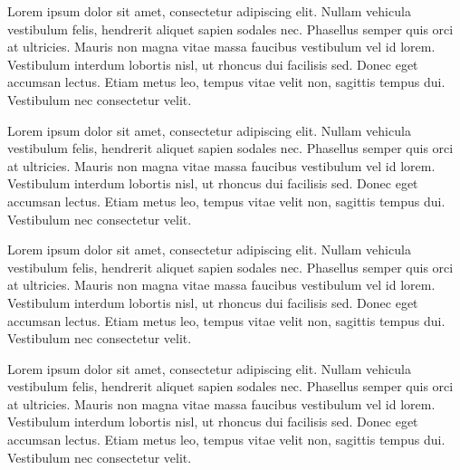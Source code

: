 Lorem ipsum dolor sit amet, consectetur adipiscing elit. Nullam vehicula vestibulum felis, hendrerit aliquet sapien sodales nec. Phasellus semper quis orci at ultricies. Mauris non magna vitae massa faucibus vestibulum vel id lorem. Vestibulum interdum lobortis nisl, ut rhoncus dui facilisis sed. Donec eget accumsan lectus. Etiam metus leo, tempus vitae velit non, sagittis tempus dui. Vestibulum nec consectetur velit.


Lorem ipsum dolor sit amet, consectetur adipiscing elit. Nullam vehicula vestibulum felis, hendrerit aliquet sapien sodales nec. Phasellus semper quis orci at ultricies. Mauris non magna vitae massa faucibus vestibulum vel id lorem. Vestibulum interdum lobortis nisl, ut rhoncus dui facilisis sed. Donec eget accumsan lectus. Etiam metus leo, tempus vitae velit non, sagittis tempus dui. Vestibulum nec consectetur velit.


Lorem ipsum dolor sit amet, consectetur adipiscing elit. Nullam vehicula vestibulum felis, hendrerit aliquet sapien sodales nec. Phasellus semper quis orci at ultricies. Mauris non magna vitae massa faucibus vestibulum vel id lorem. Vestibulum interdum lobortis nisl, ut rhoncus dui facilisis sed. Donec eget accumsan lectus. Etiam metus leo, tempus vitae velit non, sagittis tempus dui. Vestibulum nec consectetur velit.


Lorem ipsum dolor sit amet, consectetur adipiscing elit. Nullam vehicula vestibulum felis, hendrerit aliquet sapien sodales nec. Phasellus semper quis orci at ultricies. Mauris non magna vitae massa faucibus vestibulum vel id lorem. Vestibulum interdum lobortis nisl, ut rhoncus dui facilisis sed. Donec eget accumsan lectus. Etiam metus leo, tempus vitae velit non, sagittis tempus dui. Vestibulum nec consectetur velit.


